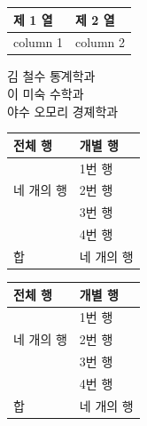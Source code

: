 \documentclass[11pt]{article}
\begin{document}
{
\tabcolsep=0in
\begin{tabular}{l|l}
제 1 열 & 제 2 열 \\ \hline
column 1 & column 2
\end{tabular}}

\begin{tabbing}
김 철수 \= 통계학과 \\
이 미숙 \> 수학과 \\
야수 오모리 \> 경졔학과
\end{tabbing}


\begin{tabular}{|l|l|} \hline
전체 행 & 개별 행 \\ \hline
\multirow{3}{*}{네 개의 행} & 1번 행 \\
& 2번 행 \\
& 3번 행 \\
& 4번 행 \\ \hline
합 & 네 개의 행 \\ \hline
\end{tabular}

\begin{tabular}{|l|l|} \hline
전체 행 & 개별 행 \\ \hline
\multirow{3}{*}[-8pt]{네 개의 행} & 1번 행 \\
& 2번 행 \\
& 3번 행 \\
& 4번 행 \\ \hline
합 & 네 개의 행 \\ \hline
\end{tabular}
\end{document}
